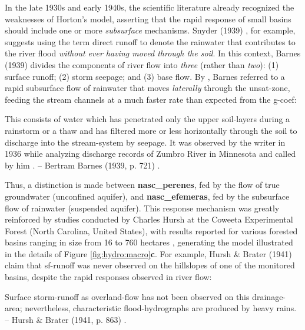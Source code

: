 \documentclass[./main_en.tex]{subfiles}
\begin{document}
\par In the late 1930s and early 1940s, the scientific literature already recognized the weaknesses of Horton’s \gls{model}, asserting that the rapid response of small basins should include one or more \textit{subsurface} mechanisms. Snyder (1939) \cite{Snyder1939}, for example, suggests using the term direct runoff to denote the rainwater that contributes to the river flood \textit{without ever having moved through the soil}. In this context, Barnes (1939) \cite{Barnes1939} divides the components of river flow into \textit{three} (rather than \textit{two}): (1) surface runoff; (2) storm seepage; and (3) base flow. By , Barnes referred to a rapid subsurface flow of rainwater that moves \textit{laterally} through the \gls{unsat-zone}, feeding the stream channels at a much faster rate than expected from the \gls{g-coef}:

\begin{adjustwidth}{100pt}{0pt}
\medskip
\small This consists of water which has penetrated only the upper soil-layers during a rainstorm or a thaw and has filtered more or less horizontally through the soil to discharge into the stream-system by seepage. It was observed by the writer in 1936 while analyzing discharge records of Zumbro River in Minnesota and called by him . -- Bertram Barnes (1939, p. 721) \cite{Barnes1939}.
\medskip
\end{adjustwidth}

\noindent Thus, a distinction is made between \textbf{\gls{nasc_perenes}}, fed by the flow of true groundwater (unconfined aquifer), and \textbf{\gls{nasc_efemeras}}, fed by the subsurface flow of rainwater (suspended aquifer). This response mechanism was greatly reinforced by studies conducted by Charles Hursh at the Coweeta Experimental Forest (North Carolina, United States), with results reported for various forested basins ranging in size from 16 to 760 hectares \cite{Hoover1943, Hursh1944}, generating the \gls{model} illustrated in the details of Figure \ref{fig:hydro:macro}\textbf{c}. For example, Hursh \& Brater (1941) \cite{Hursh1941} claim that \gls{sf-runoff} was never observed on the hillslopes of one of the monitored basins, despite the rapid responses observed in river flow:

\begin{adjustwidth}{100pt}{0pt}
\medskip
\small Surface storm-runoff as overland-flow has not been observed on this drainage-area; nevertheless, characteristic flood-hydrographs are produced by heavy rains. -- Hursh \& Brater (1941, p. 863) \cite{Hursh1941}.
\medskip
\end{adjustwidth}
\end{document}

